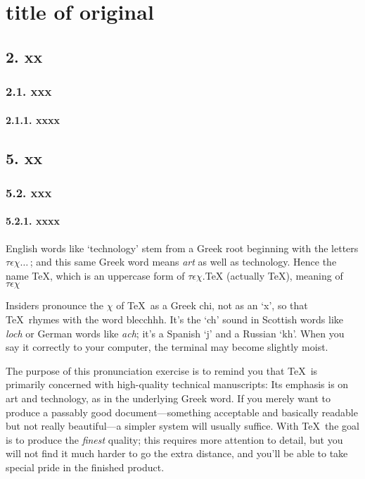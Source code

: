
\chapter*{title of original}
\section*{2. xx}
\subsection*{2.1. xxx}
\subsubsection*{2.1.1. xxxx}
\section*{5. xx}
\subsection*{5.2. xxx}
\subsubsection*{5.2.1. xxxx}
English words like `technology' stem from a Greek root beginning with
the letters $\tau\epsilon\chi\ldots\,$; and this same Greek word means {\sl
art\/} as well as technology. Hence the name \TeX, which is an
uppercase form of $\tau\epsilon\chi$.{TeX (actually \TeX), meaning of}
$\tau\epsilon\chi$

Insiders pronounce the $\chi$ of \TeX\ as a Greek chi, not as an `x', so that
\TeX\ rhymes with the word blecchhh. It's the `ch' sound in Scottish words
like {\sl loch\/} or German words like {\sl ach\/}; it's a Spanish `j' and a
Russian `kh'. When you say it correctly to your computer, the terminal
may become slightly moist.

The purpose of this pronunciation exercise is to remind you that \TeX\ is
primarily concerned with high-quality technical manuscripts: Its emphasis is
on art and technology, as in the underlying Greek word. If you merely want
to produce a passably good document---something acceptable and basically
readable but not really beautiful---a simpler system will usually suffice.
With \TeX\ the goal is to produce the {\sl finest\/} quality; this requires
more attention to detail, but you will not find it much harder to go the
extra distance, and you'll be able to take special pride in the finished
product.

